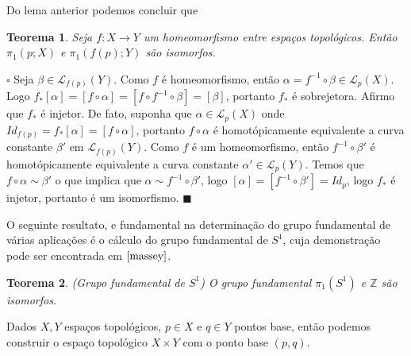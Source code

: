 \documentclass[12pt]{book}
\newtheorem{teorema}{Teorema}[section]
\newenvironment{prova}[1]{$\square$ #1}{\hfill$\blacksquare$}
\newcommand{\caminhospontobasegeral}[2]{\mathcal{L}_{#1}(#2)}
\newcommand{\circulo}{S^{1}}
\newcommand{\classe}[1]{[#1]}
\newcommand{\grupofundamental}[1]{\pi_{1}(#1)}
\newcommand{\grupofundamentalpontobase}[2]{\pi_{1}(#1; #2)}
\begin{document}
		Do lema anterior podemos concluir que
		\begin{teorema}
			Seja $f:X\to Y$ um homeomorfismo entre espaços topológicos. Então $\grupofundamentalpontobase{p}{X}$ e $\grupofundamentalpontobase{f(p)}{Y}$ são isomorfos.
		\end{teorema}
		\begin{prova}
			Seja $\beta \in \caminhospontobasegeral{f(p)}{Y}$. Como $f$ é homeomorfismo, então $\alpha=f^{-1}\circ\beta \in \caminhospontobasegeral{p}{X}$. Logo $f_{*}\classe{\alpha} = \classe{f\circ\alpha} = \classe{f\circ f^{-1}\circ\beta}=\classe{\beta}$, portanto $f_{*}$ é sobrejetora. Afirmo que $f_{*}$ é injetor. De fato, suponha que $\alpha \in \caminhospontobasegeral{p}{X}$ onde $Id_{f(p)}=f_{*}\classe{\alpha} = \classe{f\circ \alpha} $, portanto $f\circ\alpha$ é homotópicamente equivalente a curva constante $\beta'$ em $\caminhospontobasegeral{f(p)}{Y}$. Como $f$ é um homeomorfismo, então $f^{-1}\circ\beta'$ é homotópicamente equivalente a curva constante $\alpha' \in \caminhospontobasegeral{p}{Y}$. Temos que $f\circ \alpha\sim \beta'$ o que implica que $\alpha \sim f^{-1}\circ \beta'$, logo $\classe{\alpha} = \classe{f^{-1}\circ \beta'} = Id_{p}$, logo $f_{*}$ é injetor, portanto é um isomorfismo.
		\end{prova}
		
		O seguinte resultato, e fundamental na determinação do grupo fundamental de várias aplicações é o cálculo do grupo fundamental de $\circulo$, cuja demonstração pode ser encontrada em $\cite{massey}$.
		
		\begin{teorema}\label{teorema_grupo_fundamental_circulo}
			(Grupo fundamental de $\circulo$) O grupo fundamental $\grupofundamental{\circulo}$ e $\mathbb{Z}$ são isomorfos.
		\end{teorema} 
		
		Dados $X, Y$ espaços topológicos, $p\in X$ e $q\in Y$ pontos base, então podemos construir o espaço topológico $X\times Y$ com o ponto base $(p,q)$.
		
\end{document}
